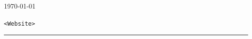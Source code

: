 \begin{titlepage}

	\colorbox{NordBrightBlue}{
		\parbox[t]{0.93\textwidth}{ %
			\parbox[t]{0.91\textwidth}{ %
				\raggedleft %
				\fontsize{40pt}{80pt}\selectfont %
				\vspace{0.7cm} %

				\titleone \\
				\titletwo

				\vspace{0.7cm} %
			}
		}
	}

	\vfill %


	\parbox[t]{0.93\textwidth}{
		\raggedleft
		\large
		{\Large \theauthor}\\[4pt]
		\today\\
		\instituteone\\ [4pt]
		\texttt{<Website>}\\

		\hfill\rule{0.4\linewidth}{1pt}
	}

\end{titlepage}
